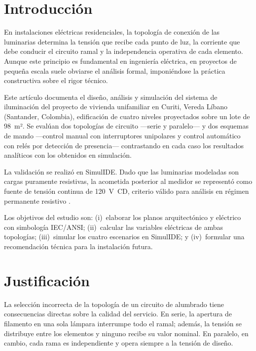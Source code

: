 \section{Introducción}

En instalaciones eléctricas residenciales, la topología de conexión de las luminarias determina la tensión que recibe cada punto de luz, la corriente que debe conducir el circuito ramal y la independencia operativa de cada elemento. Aunque este principio es fundamental en ingeniería eléctrica, en proyectos de pequeña escala suele obviarse el análisis formal, imponiéndose la práctica constructiva sobre el rigor técnico.

Este artículo documenta el diseño, análisis y simulación del sistema de iluminación del proyecto de vivienda unifamiliar en Curiti, Vereda Líbano (Santander, Colombia), edificación de cuatro niveles proyectados sobre un lote de 98~m². Se evalúan dos topologías de circuito —serie y paralelo— y dos esquemas de mando —control manual con interruptores unipolares y control automático con relés por detección de presencia— contrastando en cada caso los resultados analíticos con los obtenidos en simulación.

La validación se realizó en SimulIDE. Dado que las luminarias modeladas son cargas puramente resistivas, la acometida posterior al medidor se representó como fuente de tensión continua de 120~V~CD, criterio válido para análisis en régimen permanente resistivo \cite{hayt2012}.

Los objetivos del estudio son: (i)~elaborar los planos arquitectónico y eléctrico con simbología IEC/ANSI; (ii)~calcular las variables eléctricas de ambas topologías; (iii)~simular los cuatro escenarios en SimulIDE; y (iv)~formular una recomendación técnica para la instalación futura.

\section{Justificación}

La selección incorrecta de la topología de un circuito de alumbrado tiene consecuencias directas sobre la calidad del servicio. En serie, la apertura de filamento en una sola lámpara interrumpe todo el ramal; además, la tensión se distribuye entre los elementos y ninguno recibe su valor nominal. En paralelo, en cambio, cada rama es independiente y opera siempre a la tensión de diseño.

